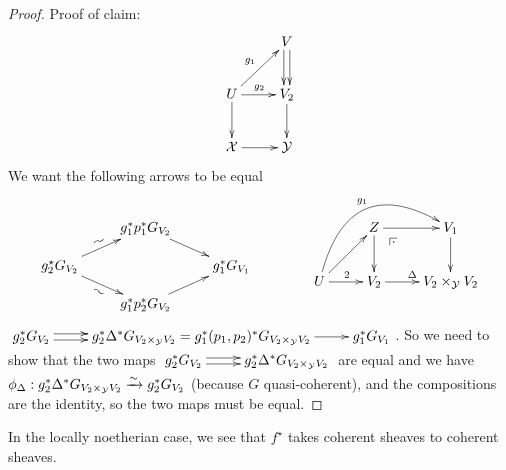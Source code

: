 \begin{proof}
Proof of claim:
\[\xymatrix{
 & V\ar@<.5ex>[d] \ar@<-.5ex>[d]\\
 U\ar[d]\ar[ur]^{g_1} \ar[r]^{g_2} & V_2\ar[d]\\
 \X \ar[r] & \Y
}\]
We want the following arrows to be equal
\[\xymatrix@R-1pc{
 & g_1^* p_1^* G_{V_2}\ar[dr]\\
 g_2^\star G_{V_2}\ar[ur]^@{~}\ar[dr]_@{~} & & g_1^* G_{V_1}\\
 &g_1^*p_2^* G_{V_2}\ar[ur]
}\qquad\qquad\xymatrix{
 & Z\ar[r]\ar[d] \ar@{}[dr]|(.25)\pb & V_1\ar[d]\\
 U\ar[r]^2 \ar@/^3pc/[rru]^{g_1}\ar[ur] & V_2 \ar[r]^\Delta & V_2\times_\Y V_2
}\]
$\xymatrix{g_2^*G_{V_2}\ar@<.5ex>[r]\ar@<-.5ex>[r] & g_2^* \Delta^* G_{V_2\times_\Y V_2} = g_1^* (p_1,p_2)^* G_{V_2\times_\Y V_2}\ar[r] & g_1^* G_{V_1}}$. So we need to show that the two maps $\xymatrix{g_2^* G_{V_2}\ar@<.5ex>[r]\ar@<-.5ex>[r] & g_2^* \Delta^* G_{V_2\times_\Y V_2}}$ are equal and we have $\phi_\Delta:g_2^*\Delta^* G_{V_2\times_{\mathcal{Y}} V_2}\xrightarrow\sim g_2^* G_{V_2}$ (because $G$ quasi-coherent), and the compositions are the identity, so the two maps must be equal.
\end{proof}
\begin{remark}
 In the locally noetherian case, we see that $f^\star$ takes coherent sheaves to coherent sheaves.
\end{remark}

